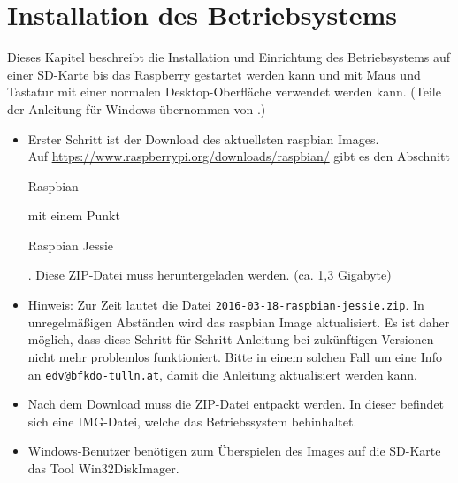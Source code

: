 \label{sec:schritte}

\section{Installation des Betriebsystems}
\label{sec:stepsinstall}
Dieses Kapitel beschreibt die Installation und Einrichtung des Betriebsystems auf einer SD-Karte bis das Raspberry gestartet werden kann und mit Maus und Tastatur mit einer normalen Desktop-Oberfläche verwendet werden kann. (Teile der Anleitung für Windows übernommen von \cite{install}.)

\begin{itemize}
	\item {Erster Schritt ist der Download des aktuellsten raspbian Images.\\
		Auf \url{https://www.raspberrypi.org/downloads/raspbian/} gibt es den Abschnitt \begin{em}Raspbian\end{em} mit einem Punkt \begin{em}Raspbian Jessie\end{em}. 
		Diese ZIP-Datei muss heruntergeladen werden.
		(ca. 1,3 Gigabyte)
		}
	\item {Hinweis: Zur Zeit lautet die Datei \lstinline|2016-03-18-raspbian-jessie.zip|.
		In unregelmäßigen Abständen wird das raspbian Image aktualisiert.
		Es ist daher möglich, dass diese Schritt-für-Schritt Anleitung bei zukünftigen Versionen nicht mehr problemlos funktioniert.
		Bitte in einem solchen Fall um eine Info an \verb|edv@bfkdo-tulln.at|, damit die Anleitung aktualisiert werden kann.}
	\item {Nach dem Download muss die ZIP-Datei entpackt werden. In dieser befindet sich eine IMG-Datei, welche das Betriebssystem behinhaltet.}
	\item {Windows-Benutzer benötigen zum Überspielen des Images auf die SD-Karte das Tool Win32DiskImager.\\
}
\end{itemize}

